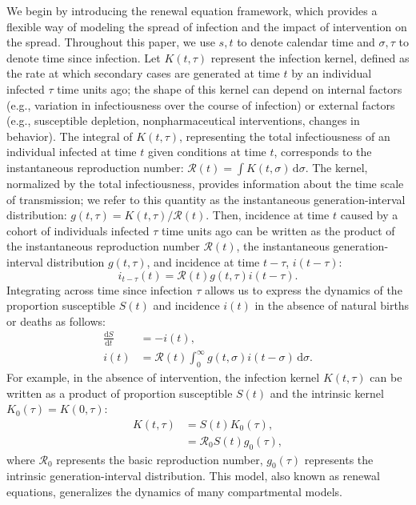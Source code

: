 \documentclass[12pt]{article}
\newcommand{\Rx}[1]{\ensuremath{{\mathcal R}_{#1}}\xspace}
\newcommand{\Ro}{\Rx{0}}
\newcommand{\RR}{\ensuremath{{\mathcal R}}\xspace}
\newcommand{\dd}[1]{\ensuremath{\, \mathrm{d}#1}}
\newcommand{\dsigma}{\dd{\sigma}}
\begin{document}
We begin by introducing the renewal equation framework, which provides a flexible way of modeling the spread of infection and the impact of intervention on the spread.
Throughout this paper, we use $s, t$ to denote calendar time and $\sigma, \tau$ to denote time since infection.
Let $K(t, \tau)$ represent the infection kernel, defined as the rate at which secondary cases are generated at time $t$ by an individual infected $\tau$ time units ago;
the shape of this kernel can depend on internal factors (e.g., variation in infectiousness over the course of infection) or external factors (e.g., susceptible depletion, nonpharmaceutical interventions, changes in behavior).
The integral of $K(t, \tau)$, representing the total infectiousness of an individual infected at time $t$ given conditions at time $t$, corresponds to the instantaneous reproduction number: $\RR(t) = \int K(t, \sigma) \dsigma$.
The kernel, normalized by the total infectiousness, provides information about the time scale of transmission; we refer to this quantity as the instantaneous generation-interval distribution: $g(t, \tau) = K(t, \tau)/\RR(t)$.
Then, incidence at time $t$ caused by a cohort of individuals infected $\tau$ time units ago can be written as the product of the instantaneous reproduction number $\RR(t)$, the instantaneous generation-interval distribution $g(t, \tau)$, and incidence at time $t-\tau$, $i(t-\tau)$:
\begin{equation}
i_{t-\tau}(t) = \RR(t) g(t, \tau) i(t-\tau).
\end{equation}
Integrating across time since infection $\tau$ allows us to express the dynamics of the proportion susceptible $S(t)$ and incidence $i(t)$ in the absence of natural births or deaths as follows: 
\begin{align}
\frac{\mathrm{d}S}{\mathrm{d}t} &= - i(t),\\
i(t) &= \RR(t) \int_0^\infty  g(t, \sigma) i(t-\sigma) \dsigma.
\label{eq:renewal}
\end{align}
For example, in the absence of intervention, the infection kernel $K(t, \tau)$ can be written as a product of proportion susceptible $S(t)$ and the intrinsic kernel $K_0(\tau) = K(0, \tau)$:
\begin{align}
K(t, \tau) &= S(t) K_0(\tau),\\
&= \Ro S(t) g_0(\tau),
\end{align}
where $\Ro$ represents the basic reproduction number, $g_0(\tau)$ represents the intrinsic generation-interval distribution.
This model, also known as renewal equations, generalizes the dynamics of many compartmental models.
\end{document}
